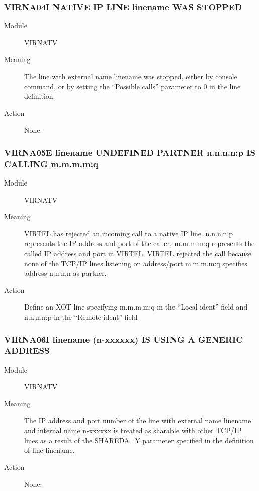 \documentclass[letterpaper,10pt,english]{sphinxmanual}
\begin{document}
\subsubsection{VIRNA04I NATIVE IP LINE linename WAS STOPPED}
\label{\detokenize{messages:virna04i-native-ip-line-linename-was-stopped}}\begin{description}
\item[{Module}] \leavevmode
VIRNATV

\item[{Meaning}] \leavevmode
The line with external name linename was stopped, either by console command, or by setting the “Possible calls” parameter to 0 in the line definition.

\item[{Action}] \leavevmode
None.

\end{description}


\subsubsection{VIRNA05E linename UNDEFINED PARTNER n.n.n.n:p IS CALLING m.m.m.m:q}
\label{\detokenize{messages:virna05e-linename-undefined-partner-n-n-n-n-p-is-calling-m-m-m-m-q}}\begin{description}
\item[{Module}] \leavevmode
VIRNATV

\item[{Meaning}] \leavevmode
VIRTEL has rejected an incoming call to a native IP line. n.n.n.n:p represents the IP address and port of the caller, m.m.m.m:q represents the called IP address and port in VIRTEL. VIRTEL rejected the call because none of the TCP/IP lines listening on address/port m.m.m.m:q specifies address n.n.n.n as partner.

\item[{Action}] \leavevmode
Define an XOT line specifying m.m.m.m:q in the “Local ident” field and n.n.n.n:p in the “Remote ident” field

\end{description}


\subsubsection{VIRNA06I linename (n-xxxxxx) IS USING A GENERIC ADDRESS}
\label{\detokenize{messages:virna06i-linename-n-xxxxxx-is-using-a-generic-address}}\begin{description}
\item[{Module}] \leavevmode
VIRNATV

\item[{Meaning}] \leavevmode
The IP address and port number of the line with external name linename and internal name n-xxxxxx is treated as sharable with other TCP/IP lines as a result of the SHAREDA=Y parameter specified in the definition of line linename.

\item[{Action}] \leavevmode
None.

\end{description}
\end{document}

